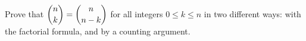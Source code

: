 Prove that $\dbinom nk=\dbinom n{n-k}$ for all integers $0\le k\le n$ in two different ways: with the factorial formula, and by a counting argument.
